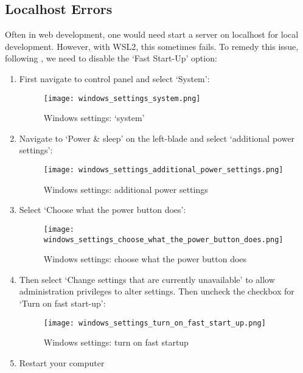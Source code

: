 \subsection{Localhost Errors}
Often in web development, one would need start a server on localhost for local
development. However, with WSL2, this sometimes fails. To remedy this issue,
following \cite{reescarter2020wsl2}, we need to disable the `Fast Start-Up'
option:
\begin{enumerate}
    \item First navigate to control panel and select `System':
        \begin{figure}[H]
            \centering
            \texttt{[image: windows\_settings\_system.png]}
            \caption{Windows settings: `system'}
            \label{FigWindowsSettingsSystem}
        \end{figure}
    \item Navigate to `Power \& sleep' on the left-blade and select `additional
        power settings':
        \begin{figure}[H]
            \centering
            \texttt{[image: windows\_settings\_additional\_power\_settings.png]}
            \caption{Windows settings: additional power settings}
            \label{FigAdditionalPowerSettings}
        \end{figure}
    \item Select `Choose what the power button does':
        \begin{figure}[H]
            \centering
            \texttt{[image: windows\_settings\_choose\_what\_the\_power\_button\_does.png]}
            \caption{Windows settings: choose what the power button does}
            \label{FigChoosePowerButton}
        \end{figure}
    \item Then select `Change settings that are currently unavailable' to allow
        administration privileges to alter settings. Then uncheck the checkbox
        for `Turn on fast start-up':
        \begin{figure}[H]
            \centering
            \texttt{[image: windows\_settings\_turn\_on\_fast\_start\_up.png]}
            \caption{Windows settings: turn on fast startup}
            \label{FigTurnOnFastStartUp}
        \end{figure}
    \item Restart your computer
\end{enumerate}

